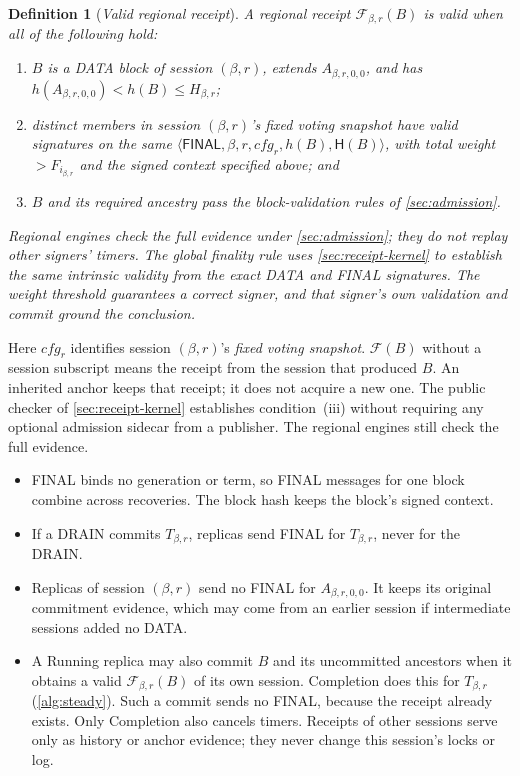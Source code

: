 \documentclass[11pt,a4paper]{article}
\newcommand{\FC}{\mathcal F}
\newcommand{\Hash}{\mathsf H}
\newcommand{\tagg}[1]{\ensuremath{\mathsf{#1}}}
\newcommand{\defterm}[1]{\textcolor{rrBlue}{\textit{#1}}}
\newtheorem{definition}{Definition}[section]
\begin{document}
\begin{definition}[\defterm{Valid regional receipt}]
\label{def:receipt}
A regional receipt $\FC_{\beta,r}(B)$ is valid when all of the following hold:
\begin{enumerate}[label=(\roman*)]
\item $B$ is a DATA block of session $(\beta,r)$, extends
$A_{\beta,r,0,0}$, and has $h(A_{\beta,r,0,0})<h(B)\le H_{\beta,r}$;
\item distinct members in session $(\beta,r)$'s fixed voting snapshot have
valid signatures on the same
$\langle\tagg{FINAL},\beta,r,\mathit{cfg}_r,h(B),\Hash(B)\rangle$,
with total weight $>F_{i_{\beta,r}}$ and the signed context specified above; and
\item $B$ and its required ancestry pass the block-validation rules of
\cref{sec:admission}.
\end{enumerate}
Regional engines check the full evidence under \cref{sec:admission};
they do not replay other signers' timers. The global finality rule uses
\cref{sec:receipt-kernel} to establish the same intrinsic validity from
the exact DATA and FINAL signatures. The weight threshold guarantees a
correct signer, and that signer's own validation and commit ground the
conclusion.
\end{definition}
Here $\mathit{cfg}_r$ identifies session $(\beta,r)$'s \defterm{fixed
voting snapshot}. $\FC(B)$ without a session subscript means the receipt
from the session that produced $B$. An inherited anchor keeps that
receipt; it does not acquire a new one. The public checker of
\cref{sec:receipt-kernel} establishes condition~(iii) without requiring
any optional admission sidecar from a publisher. The regional engines
still check the full evidence.
\begin{itemize}
\item FINAL binds no generation or term, so FINAL messages for one block
combine across recoveries. The block hash keeps the block's signed
context.
\item If a DRAIN commits $T_{\beta,r}$, replicas send FINAL for
$T_{\beta,r}$, never for the DRAIN.
\item Replicas of session $(\beta,r)$ send no FINAL for $A_{\beta,r,0,0}$.
It keeps its original commitment evidence, which may come from an earlier
session if intermediate sessions added no DATA.
\item A Running replica may also commit $B$ and its uncommitted ancestors when it
obtains a valid $\FC_{\beta,r}(B)$ of its own session. Completion does
this for $T_{\beta,r}$ (\cref{alg:steady}). Such a commit sends no FINAL,
because the receipt already exists. Only Completion also cancels timers.
Receipts of other sessions serve only as history or anchor evidence;
they never change this session's locks or log.
\end{itemize}
\end{document}
